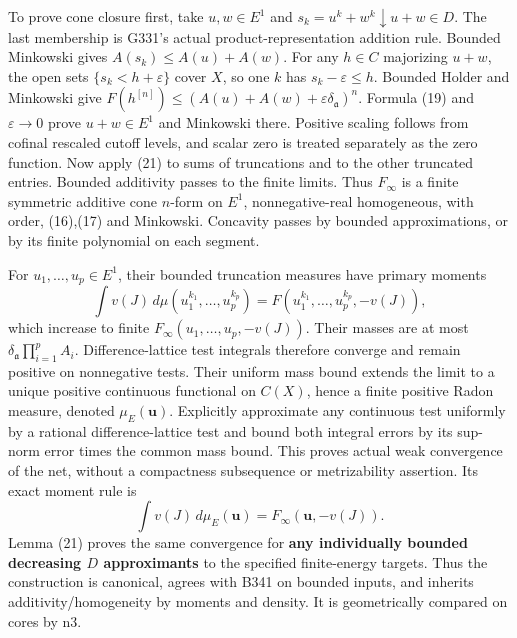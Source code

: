 \documentclass[
  11pt,
]{article}
\begin{document}
To prove cone closure first, take \(u,w\in E^1\) and
\(s_k=u^k+w^k\downarrow u+w\in D\). The last membership is G331's actual
product-representation addition rule. Bounded Minkowski gives
\(A(s_k)\le A(u)+A(w)\). For any \(h\in C\) majorizing \(u+w\), the open
sets \(\{s_k<h+\varepsilon\}\) cover \(X\), so one \(k\) has
\(s_k-\varepsilon\le h\). Bounded Holder and Minkowski give
\(F(h^{[n]})\le(A(u)+A(w)+\varepsilon\delta_{\mathfrak a})^n\). Formula
(19) and \(\varepsilon\to0\) prove \(u+w\in E^1\) and Minkowski there.
Positive scaling follows from cofinal rescaled cutoff levels, and scalar
zero is treated separately as the zero function. Now apply (21) to sums
of truncations and to the other truncated entries. Bounded additivity
passes to the finite limits. Thus \(F_\infty\) is a finite symmetric
additive cone \(n\)-form on \(E^1\), nonnegative-real homogeneous, with
order, (16),(17) and Minkowski. Concavity passes by bounded
approximations, or by its finite polynomial on each segment.

For \(u_1,\ldots,u_p\in E^1\), their bounded truncation measures have
primary moments
\[\int v(J)\,d\mu(u_1^{k_1},\ldots,u_p^{k_p})=F(u_1^{k_1},\ldots,u_p^{k_p},-v(J)),\]
which increase to finite \(F_\infty(u_1,\ldots,u_p,-v(J))\). Their
masses are at most \(\delta_{\mathfrak a}\prod_{i=1}^p A_i\).
Difference-lattice test integrals therefore converge and remain positive
on nonnegative tests. Their uniform mass bound extends the limit to a
unique positive continuous functional on \(C(X)\), hence a finite
positive Radon measure, denoted \(\mu_E(\boldsymbol u)\). Explicitly
approximate any continuous test uniformly by a rational
difference-lattice test and bound both integral errors by its sup-norm
error times the common mass bound. This proves actual weak convergence
of the net, without a compactness subsequence or metrizability
assertion. Its exact moment rule is
\[\int v(J)\,d\mu_E(\boldsymbol u)=F_\infty(\boldsymbol u,-v(J)).\tag{22}\]
Lemma (21) proves the same convergence for \textbf{any individually
bounded decreasing \(D\) approximants} to the specified finite-energy
targets. Thus the construction is canonical, agrees with B341 on bounded
inputs, and inherits additivity/homogeneity by moments and density. It
is geometrically compared on cores by n3.
\end{document}
